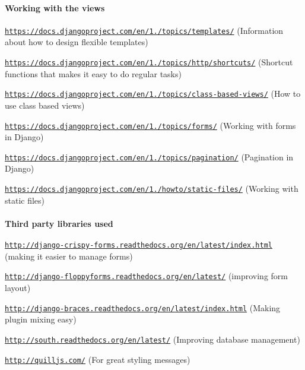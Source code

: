 \paragraph*{Working with the views}


\begin{DoxyEnumerate}
\item \href{https://docs.djangoproject.com/en/1.6/topics/templates/}{\tt https\-://docs.\-djangoproject.\-com/en/1./topics/templates/} (Information about how to design flexible templates)
\item \href{https://docs.djangoproject.com/en/1.6/topics/http/shortcuts/}{\tt https\-://docs.\-djangoproject.\-com/en/1./topics/http/shortcuts/} (Shortcut functions that makes it easy to do regular tasks)
\item \href{https://docs.djangoproject.com/en/1.6/topics/class-based-views/}{\tt https\-://docs.\-djangoproject.\-com/en/1./topics/class-\/based-\/views/} (How to use class based views)
\item \href{https://docs.djangoproject.com/en/1.6/topics/forms/}{\tt https\-://docs.\-djangoproject.\-com/en/1./topics/forms/} (Working with forms in Django)
\item \href{https://docs.djangoproject.com/en/1.6/topics/pagination/}{\tt https\-://docs.\-djangoproject.\-com/en/1./topics/pagination/} (Pagination in Django)
\item \href{https://docs.djangoproject.com/en/1.6/howto/static-files/}{\tt https\-://docs.\-djangoproject.\-com/en/1./howto/static-\/files/} (Working with static files)
\end{DoxyEnumerate}

\paragraph*{Third party libraries used}


\begin{DoxyEnumerate}
\item \href{http://django-crispy-forms.readthedocs.org/en/latest/index.html}{\tt http\-://django-\/crispy-\/forms.\-readthedocs.\-org/en/latest/index.\-html} (making it easier to manage forms)
\item \href{http://django-floppyforms.readthedocs.org/en/latest/}{\tt http\-://django-\/floppyforms.\-readthedocs.\-org/en/latest/} (improving form layout)
\item \href{http://django-braces.readthedocs.org/en/latest/index.html}{\tt http\-://django-\/braces.\-readthedocs.\-org/en/latest/index.\-html} (Making plugin mixing easy)
\item \href{http://south.readthedocs.org/en/latest/}{\tt http\-://south.\-readthedocs.\-org/en/latest/} (Improving database management)
\end{DoxyEnumerate}
\begin{DoxyEnumerate}
\item \href{http://quilljs.com/}{\tt http\-://quilljs.\-com/} (For great styling messages)
\end{DoxyEnumerate}


